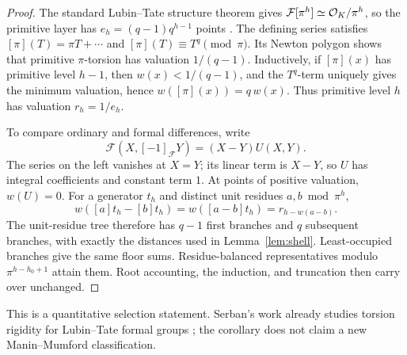 \begin{proof}
The standard Lubin--Tate structure theorem gives
\(\mathcal F[\pi^h]\simeq\mathcal O_K/\pi^h\), so the primitive layer has
\(e_h=(q-1)q^{h-1}\) points \cite{lt}.
The defining series satisfies
\([\pi](T)=\pi T+\cdots\) and
\([\pi](T)\equiv T^q\pmod\pi\).
Its Newton polygon shows that primitive \(\pi\)-torsion has valuation \(1/(q-1)\). Inductively, if \([\pi](x)\) has primitive level \(h-1\), then \(w(x)<1/(q-1)\), and the \(T^q\)-term uniquely gives the minimum valuation, hence
\(w([\pi](x))=q\,w(x)\).
Thus primitive level \(h\) has valuation
\(r_h=1/e_h\).

To compare ordinary and formal differences, write
\[
 \mathcal F(X,[-1]_{\mathcal F}Y)=(X-Y)U(X,Y).
\]
The series on the left vanishes at \(X=Y\); its linear term is \(X-Y\), so \(U\) has integral coefficients and constant term \(1\). At points of positive valuation, \(w(U)=0\).
For a generator \(t_h\) and distinct unit residues \(a,b\bmod\pi^h\),
\[
 w([a]t_h-[b]t_h)
 =w([a-b]t_h)
 =r_{h-w(a-b)}.
\]
The unit-residue tree therefore has \(q-1\) first branches and \(q\) subsequent branches, with exactly the distances used in Lemma~\ref{lem:shell}. Least-occupied branches give the same floor sums. Residue-balanced representatives modulo \(\pi^{h-h_0+1}\) attain them. Root accounting, the induction, and truncation then carry over unchanged.
\end{proof}

This is a quantitative selection statement. Serban's work already studies torsion rigidity for Lubin--Tate formal groups \cite{serban}; the corollary does not claim a new Manin--Mumford classification.

